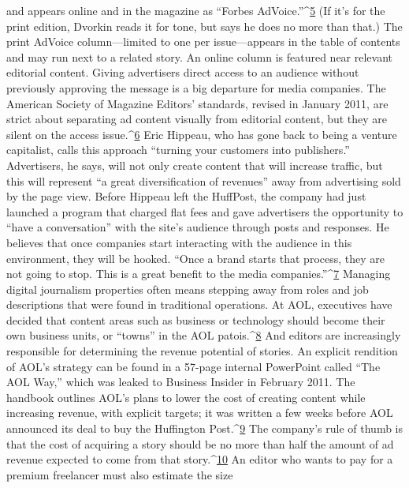 and appears online and in the magazine as ``Forbes AdVoice.''^{\href{#endnotes-ch9}{5}} (If it’s for the print
edition, Dvorkin reads it for tone, but says he does no more than that.) The print
AdVoice column—limited to one per issue—appears in the table of contents
and may run next to a related story. An online column is featured near relevant
editorial content.
Giving advertisers direct access to an audience without previously approving
the message is a big departure for media companies. The American Society of
Magazine Editors’ standards, revised in January 2011, are strict about separating
ad content visually from editorial content, but they are silent on the access issue.^{\href{#endnotes-ch9}{6}}
Eric Hippeau, who has gone back to being a venture capitalist, calls this approach
``turning your customers into publishers.'' Advertisers, he says, will not
only create content that will increase traffic, but this will represent ``a great diversification
of revenues'' away from advertising sold by the page view. Before Hippeau
left the HuffPost, the company had just launched a program that charged
flat fees and gave advertisers the opportunity to ``have a conversation'' with the
site’s audience through posts and responses. He believes that once companies start
interacting with the audience in this environment, they will be hooked. ``Once a
brand starts that process, they are not going to stop. This is a great benefit to the
media companies.''^{\href{#endnotes-ch9}{7}}
Managing digital journalism properties often means stepping away from roles
and job descriptions that were found in traditional operations. At AOL, executives
have decided that content areas such as business or technology should become
their own business units, or ``towns'' in the AOL patois.^{\href{#endnotes-ch9}{8}} And editors are
increasingly responsible for determining the revenue potential of stories.
An explicit rendition of AOL’s strategy can be found in a 57-page internal
PowerPoint called ``The AOL Way,'' which was leaked to Business Insider in February
2011. The handbook outlines AOL’s plans to lower the cost of creating
content while increasing revenue, with explicit targets; it was written a few weeks
before AOL announced its deal to buy the Huffington Post.^{\href{#endnotes-ch9}{9}}
The company’s rule of thumb is that the cost of acquiring a story should be
no more than half the amount of ad revenue expected to come from that story.^{\href{#endnotes-ch9}{10}}
An editor who wants to pay for a premium freelancer must also estimate the size

